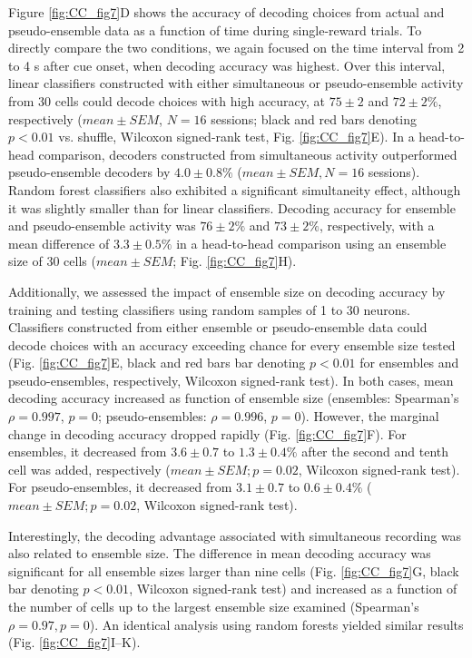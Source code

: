 Figure \ref{fig:CC_fig7}D shows the accuracy of decoding choices from actual and pseudo-ensemble data as a function of time during single-reward trials. To directly compare the two conditions, we again focused on the time interval from 2 to 4 s after cue onset, when decoding accuracy was highest. Over this interval, linear classifiers constructed with either simultaneous or pseudo-ensemble activity from 30 cells could decode choices with high accuracy, at $75 \pm 2$ and $72 \pm 2\%$, respectively ($mean \pm SEM$, $N = 16$ sessions; black and red bars denoting $p < 0.01$ vs. shuffle, Wilcoxon signed-rank test, Fig. \ref{fig:CC_fig7}E). In a head-to-head comparison, decoders constructed from simultaneous activity outperformed pseudo-ensemble decoders by $4.0 \pm 0.8\%$ ($mean \pm SEM, N = 16$ sessions). Random forest classifiers also exhibited a significant simultaneity effect, although it was slightly smaller than for linear classifiers. Decoding accuracy for ensemble and pseudo-ensemble activity was $76 \pm 2\%$ and $73 \pm 2\%$, respectively, with a mean difference of $3.3 \pm 0.5\%$ in a head-to-head comparison using an ensemble size of 30 cells ($mean \pm SEM$; Fig. \ref{fig:CC_fig7}H).

Additionally, we assessed the impact of ensemble size on decoding accuracy by training and testing classifiers using random samples of 1 to 30 neurons. Classifiers constructed from either ensemble or pseudo-ensemble data could decode choices with an accuracy exceeding chance for every ensemble size tested (Fig. \ref{fig:CC_fig7}E, black and red bars bar denoting $p < 0.01$ for ensembles and pseudo-ensembles, respectively, Wilcoxon signed-rank test). In both cases, mean decoding accuracy increased as function of ensemble size (ensembles: Spearman's $\rho = 0.997$, $p = 0$; pseudo-ensembles: $\rho = 0.996$, $p = 0$). However, the marginal change in decoding accuracy dropped rapidly (Fig. \ref{fig:CC_fig7}F). For ensembles, it decreased from $3.6 \pm 0.7$ to $1.3 \pm 0.4\%$ after the second and tenth cell was added, respectively ($mean \pm SEM; p = 0.02$, Wilcoxon signed-rank test). For pseudo-ensembles, it decreased from $3.1 \pm 0.7$ to $0.6 \pm 0.4\%$ ($mean \pm SEM; p = 0.02$, Wilcoxon signed-rank test).

Interestingly, the decoding advantage associated with simultaneous recording was also related to ensemble size. The difference in mean decoding accuracy was significant for all ensemble sizes larger than nine cells (Fig. \ref{fig:CC_fig7}G, black bar denoting $p < 0.01$, Wilcoxon signed-rank test) and increased as a function of the number of cells up to the largest ensemble size examined (Spearman's $\rho = 0.97, p = 0$). An identical analysis using random forests yielded similar results (Fig. \ref{fig:CC_fig7}I–K).

